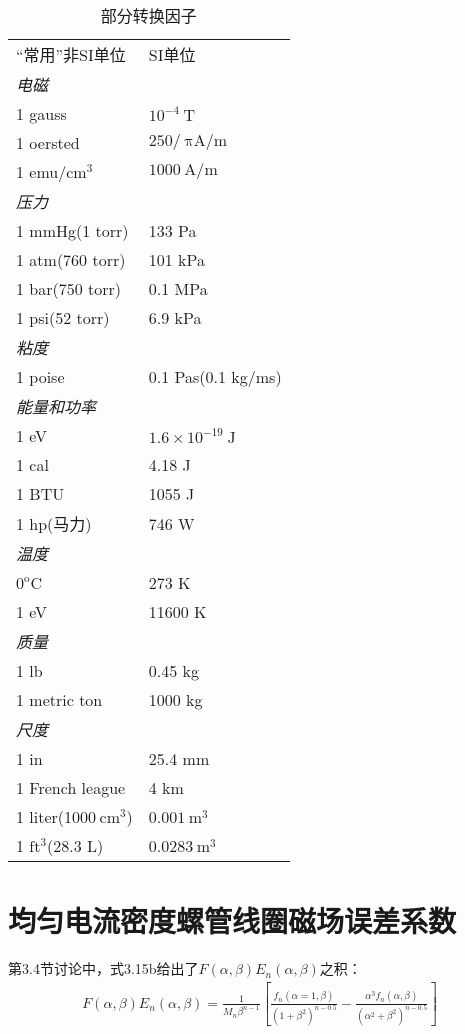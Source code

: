 \begin{table}[htbp]\small
\centering
\caption{部分转换因子}%
\begin{tabular}{ll}
``常用''非SI单位 & SI单位 \\ 
\textit{电磁} & \\ 
1 gauss & $10^{-4}\ \mathrm{T}$ \\ 
1 oersted & $250/\ \mathrm{\pi A/m}$ \\ 
1 emu/$\mathrm{cm^3}$ & $1000\ \mathrm{A/m}$ \\ 
\textit{压力}& \\ 
1 mmHg(1 torr) & 133 Pa \\ 
1 atm(760 torr) & 101 kPa \\
1 bar(750 torr) & 0.1 MPa \\ 
1 psi(52 torr) & 6.9 kPa \\ 
\textit{粘度}& \\ 
1 poise & 0.1 Pas(0.1 kg/ms) \\ 
\textit{能量和功率} & \\
1 eV & $1.6\times10^{-19}\ \mathrm{J}$ \\ 
1 cal & 4.18 J \\ 
1 BTU & 1055 J \\ 
1 hp(马力) & 746 W \\ 
\textit{温度} & \\ 
$0^\mathrm{o}\mathrm{C}$ & 273 K \\ 
1 eV & 11600 K \\ 
\textit{质量} & \\ 
1 lb & 0.45 kg \\ 
1 metric ton & 1000 kg \\ 
\textit{尺度} & \\ 
1 in & 25.4 mm \\ 
1 French league & 4 km \\ 
1 liter(1000$\ \mathrm{cm^3}$) & $0.001\ \mathrm{m^3}$ \\ 
1 $\mathrm{ft^3}$(28.3 L) & $0.0283\ \mathrm{m^3}$ \\ 
\end{tabular}
\end{table}
\newpage

\section{均匀电流密度螺管线圈磁场误差系数}
第3.4节讨论中，式3.15b给出了$F(\alpha,\beta) E_{n}(\alpha,\beta)$之积：
\begin{align*}
F(\alpha,\beta) E_{n}(\alpha,\beta)=\frac{1}{M_n \beta^{n-1}}\left[\frac{f_n(\alpha=1,\beta)}{(1+\beta^2)^{n-0.5}}-\frac{\alpha^3 f_n(\alpha,\beta)}{(\alpha^2+\beta^2)^{n-0.5}}\right] \tag{3.15b}
\end{align*}

